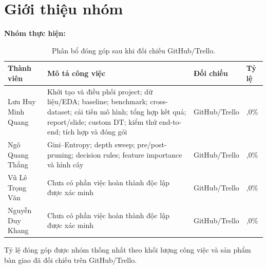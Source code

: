 \chapter*{Giới thiệu nhóm}

\noindent\textbf{Nhóm thực hiện:} \groupname

\begin{table}[H]
    \centering
    \scriptsize
    \caption*{Phân bổ đóng góp sau khi đối chiếu GitHub/Trello.}
    \begin{tabularx}{\textwidth}{@{}>{\raggedright\arraybackslash}p{}>{\raggedright\arraybackslash}X>{\centering\arraybackslash}p{}>{\centering\arraybackslash}p{}@{}}
        \toprule
        \textbf{Thành viên} & \textbf{Mô tả công việc} & \textbf{Đối chiếu} & \textbf{Tỷ lệ} \\
        \midrule
        Lưu Huy Minh Quang & Khởi tạo và điều phối project; dữ liệu/EDA; baseline; benchmark; cross-dataset; cải tiến mô hình; tổng hợp kết quả; report/slide; custom DT; kiểm thử end-to-end; tích hợp và đóng gói & GitHub/Trello & 90,0\% \\
        Ngô Quang Thắng & Gini--Entropy; depth sweep; pre/post-pruning; decision rules; feature importance và hình cây & GitHub/Trello & 10,0\% \\
        Vũ Lê Trọng Văn & Chưa có phần việc hoàn thành độc lập được xác minh & GitHub/Trello & 0,0\% \\
        Nguyễn Duy Khang & Chưa có phần việc hoàn thành độc lập được xác minh & GitHub/Trello & 0,0\% \\
        \bottomrule
    \end{tabularx}
\end{table}

Tỷ lệ đóng góp được nhóm thống nhất theo khối lượng công việc và sản phẩm bàn giao đã đối chiếu trên GitHub/Trello.

\clearpage
